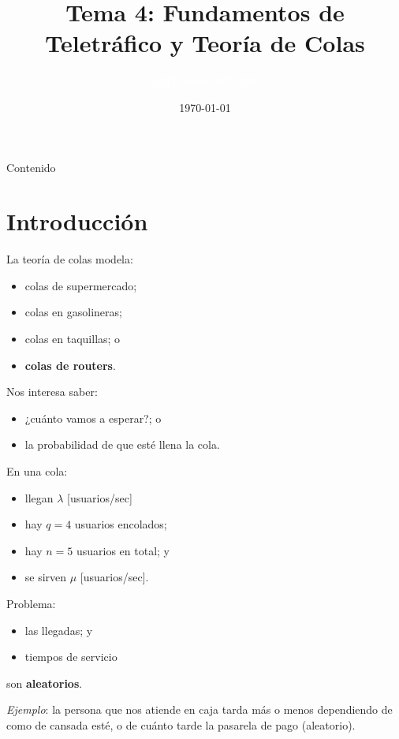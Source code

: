 \documentclass{beamer}
\title[Tema 4]{Tema 4: Fundamentos de Teletráfico y Teoría de Colas}
\author{\textcolor{white}{RSTC curso 2025-2026}}
\date{\today}
\begin{document}
\frame{\titlepage }


\begin{frame}[allowframebreaks]{Contenido}
    \tableofcontents
\end{frame}




\section{Introducción}
\begin{frame}{\secname}
    La teoría de colas modela:
    \begin{itemize}
        \item colas de supermercado;
        \item colas en gasolineras;
        \item colas en taquillas; o
        \item \textbf{colas de routers}.
    \end{itemize}

    \vfill
    Nos interesa saber:
    \begin{itemize}
        \item ¿cuánto vamos a esperar?; o
        \item la probabilidad de que esté llena la cola.
    \end{itemize}
\end{frame}



\begin{frame}{\secname}
    \begin{figure}
        
    \end{figure}

    En una cola:
    \begin{itemize}
        \item llegan $\lambda$ [usuarios/sec]
        \item hay $q=4$ usuarios encolados;
        \item hay $n=5$ usuarios en total; y
        \item se sirven $\mu$ [usuarios/sec].
    \end{itemize}
\end{frame}


\begin{frame}{\secname}
    Problema:
    \begin{itemize}
        \item las llegadas; y
        \item tiempos de servicio
    \end{itemize}
    son \textbf{aleatorios}.

    \vfill

    \textit{Ejemplo}: la persona que nos
    atiende en caja tarda más o menos
    dependiendo de como de cansada esté,
    o de cuánto tarde la pasarela de pago
    (aleatorio).
\end{frame}
\end{document}
